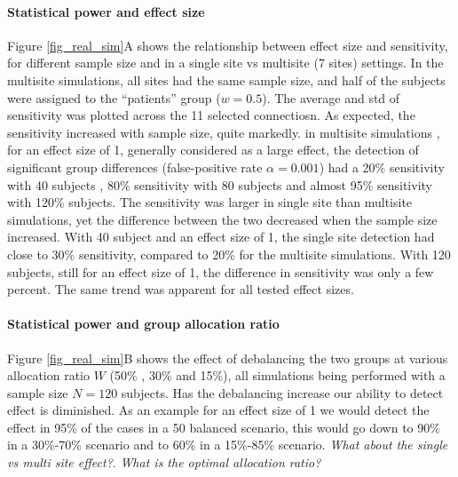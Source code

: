 \documentclass[authoryear]{elsarticle}
\begin{document}
\paragraph{Statistical power and effect size} Figure \ref{fig_real_sim}A shows the relationship between effect size and sensitivity, for different sample size and in a single site vs multisite (7 sites) settings. In the multisite simulations, all sites had the same sample size, and half of the subjects were assigned to the ``patients'' group ($w=0.5$). The average and std of sensitivity was plotted across the 11 selected connectiosn. As expected, the sensitivity increased with sample size, quite markedly. in multisite simulations , for an effect size of 1, generally considered as a large effect, the detection of significant group differences (false-positive rate $\alpha=0.001$) had a 20\% sensitivity with 40 subjects , 80\% sensitivity with 80 subjects and almost 95\% sensitivity with 120\% subjects. The sensitivity was larger in single site than multisite simulations, yet the difference between the two decreased when the sample size increased. With 40 subject and an effect size of 1, the single site detection had close to 30\% sensitivity, compared to 20\% for the multisite simulations. With 120 subjects, still for an effect size of 1, the difference in sensitivity was only a few percent. The same trend was apparent for all tested effect sizes. 

\paragraph{Statistical power and group allocation ratio} Figure \ref{fig_real_sim}B shows the effect of debalancing the two groups at various allocation ratio $W$ (50\% , 30\% and 15\%), all simulations being performed with a sample size $N=120$  subjects. Has the debalancing increase our ability to detect effect is diminished. As an example for an effect size of 1 we would detect the effect in 95\% of the cases in a 50 balanced scenario, this would go down to 90\% in a 30\%-70\% scenario and to 60\% in a 15\%-85\% scenario. \emph{What about the single vs multi site effect?}. \emph{What is the optimal allocation ratio?}
\end{document}

